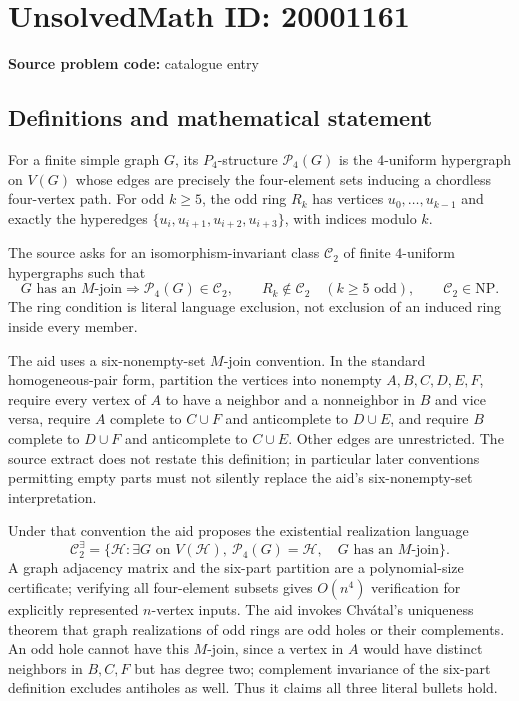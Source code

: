 \documentclass[11pt]{article}
\begin{document}
\section*{UnsolvedMath ID: 20001161}
\textbf{Source problem code:} catalogue entry
\subsection{Definitions and mathematical statement}
For a finite simple graph $G$, its $P_4$-structure $\mathcal P_4(G)$ is the $4$-uniform hypergraph on $V(G)$ whose edges are precisely the four-element sets inducing a chordless four-vertex path. For odd $k\geq5$, the odd ring $R_k$ has vertices $u_0,\ldots,u_{k-1}$ and exactly the hyperedges $\{u_i,u_{i+1},u_{i+2},u_{i+3}\}$, with indices modulo $k$.

The source asks for an isomorphism-invariant class $\mathcal C_2$ of finite $4$-uniform hypergraphs such that
\[
 G\text{ has an $M$-join}\Longrightarrow\mathcal P_4(G)\in\mathcal C_2,
 \qquad R_k\notin\mathcal C_2\quad(k\geq5\text{ odd}),
 \qquad\mathcal C_2\in\mathrm{NP}.
\]
The ring condition is literal language exclusion, not exclusion of an induced ring inside every member.

The aid uses a six-nonempty-set $M$-join convention. In the standard homogeneous-pair form, partition the vertices into nonempty $A,B,C,D,E,F$, require every vertex of $A$ to have a neighbor and a nonneighbor in $B$ and vice versa, require $A$ complete to $C\cup F$ and anticomplete to $D\cup E$, and require $B$ complete to $D\cup F$ and anticomplete to $C\cup E$. Other edges are unrestricted. The source extract does not restate this definition; in particular later conventions permitting empty parts must not silently replace the aid's six-nonempty-set interpretation.

Under that convention the aid proposes the existential realization language
\[
 \mathcal C_2^{\exists}=\{\mathcal H:\exists G\text{ on }V(\mathcal H),\
 \mathcal P_4(G)=\mathcal H,\quad G\text{ has an $M$-join}\}.
\]
A graph adjacency matrix and the six-part partition are a polynomial-size certificate; verifying all four-element subsets gives $O(n^4)$ verification for explicitly represented $n$-vertex inputs. The aid invokes Chv\'atal's uniqueness theorem that graph realizations of odd rings are odd holes or their complements. An odd hole cannot have this $M$-join, since a vertex in $A$ would have distinct neighbors in $B,C,F$ but has degree two; complement invariance of the six-part definition excludes antiholes as well. Thus it claims all three literal bullets hold.
\end{document}

